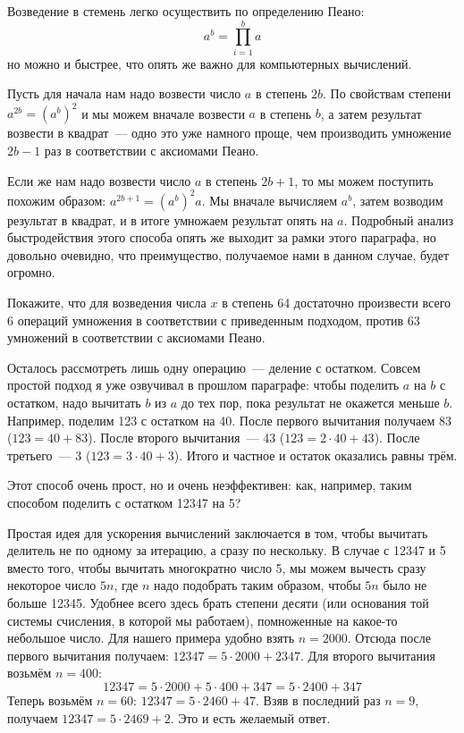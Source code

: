 Возведение в стемень легко осуществить по определению Пеано:
$$a^b = \prod_{i=1}^b a$$
но можно и быстрее, что опять же важно для компьютерных вычислений.

Пусть для начала нам надо возвести число $a$ в степень $2b$. По свойствам степени $a^{2b} = (a^b)^2$ и мы можем вначале возвести $a$ в степень $b$, а затем результат возвести в квадрат~--- одно это уже намного проще, чем производить умножение $2b - 1$ раз в соответствии с аксиомами Пеано.

Если же нам надо возвести число $a$ в степень $2b +1$, то мы можем поступить похожим образом: $a^{2b+1} = (a^b)^2a$. Мы вначале вычисляем $a^b$, затем возводим результат в квадрат, и в итоге умножаем результат опять на $a$. Подробный анализ быстродействия этого способа опять же выходит за рамки этого параграфа, но довольно очевидно, что преимущество, получаемое нами в данном случае, будет огромно.
\begin{exercise}
Покажите, что для возведения числа $x$ в степень 64 достаточно произвести всего 6 операций умножения в соответствии с приведенным подходом, против 63 умножений в соответствии с аксиомами Пеано.
\end{exercise}

Осталось рассмотреть лишь одну операцию~--- деление с остатком. Совсем простой подход я уже озвучивал в прошлом параграфе: чтобы поделить $a$ на $b$ с остатком, надо вычитать $b$ из $a$ до тех пор, пока результат не окажется меньше $b$. Например, поделим 123 с остатком на 40. После первого вычитания получаем 83 ($123 = 40 + 83$). После второго вычитания~--- 43 ($123 = 2\cdot 40 + 43$). После третьего~--- 3 ($123 = 3\cdot 40 + 3$). Итого и частное и остаток оказались равны трём.

Этот способ очень прост, но и очень неэффективен: как, например, таким способом поделить с остатком 12347 на 5?

Простая идея для ускорения вычислений заключается в том, чтобы вычитать делитель не по одному за итерацию, а сразу по нескольку. В случае с 12347 и 5 вместо того, чтобы вычитать многократно число 5, мы можем вычесть сразу некоторое число $5n$, где $n$ надо подобрать таким образом, чтобы $5n$ было не больше 12345. Удобнее всего здесь брать степени десяти (или основания той системы счисления, в которой мы работаем), помноженные на какое-то небольшое число. Для нашего примера удобно взять $n=2000$. Отсюда после первого вычитания получаем: $12347 = 5\cdot 2000 + 2347$. Для второго вычитания возьмём $n=400$:
$$12347 = 5\cdot 2000 + 5\cdot 400 + 347 = 5\cdot 2400 + 347$$
Теперь возьмём $n=60$: $12347 = 5\cdot 2460 + 47$. Взяв в последний раз $n=9$, получаем $12347 = 5\cdot 2469 + 2$. Это и есть желаемый ответ.

